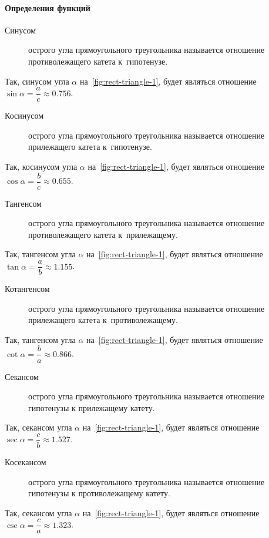 \documentclass[]{scrartcl}
\begin{document}
\paragraph{Определения функций}
\begin{description}
	\item[Синусом] острого угла прямоугольного треугольника называется отношение противолежащего катета к~гипотенузе.
\end{description}
Так, синусом угла ${\textstyle \alpha}$ на~\ref{fig:rect-triangle-1}, будет являться отношение ${\textstyle \sin \alpha = \dfrac{a}{c} \approx 0.756}$.
\begin{description}
	\item[Косинусом] острого угла прямоугольного треугольника называется отношение прилежащего катета к~гипотенузе.
\end{description}
Так, косинусом угла ${\textstyle \alpha}$ на~\ref{fig:rect-triangle-1}, будет являться отношение ${\textstyle \cos \alpha = \dfrac{b}{c} \approx 0.655}$.
\begin{description}
	\item[Тангенсом] острого угла прямоугольного треугольника называется отношение противолежащего катета к~прилежащему.
\end{description}
Так, тангенсом угла ${\textstyle \alpha}$ на~\ref{fig:rect-triangle-1}, будет являться отношение ${\textstyle \tan \alpha = \dfrac{a}{b} \approx 1.155}$.
\begin{description}
	\item[Котангенсом] острого угла прямоугольного треугольника называется отношение прилежащего катета к~противолежащему.
\end{description}
Так, тангенсом угла ${\textstyle \alpha}$ на~\ref{fig:rect-triangle-1}, будет являться отношение ${\textstyle \cot \alpha = \dfrac{b}{a} \approx 0.866}$.
\begin{description}
	\item[Секансом] острого угла прямоугольного треугольника называется отношение гипотенузы к прилежащему катету.
\end{description}
Так, секансом угла ${\textstyle \alpha}$ на~\ref{fig:rect-triangle-1}, будет являться отношение ${\textstyle \sec \alpha = \dfrac{c}{b} \approx 1.527}$.
\begin{description}
	\item[Косекансом] острого угла прямоугольного треугольника называется отношение гипотенузы к противолежащему катету.
\end{description}
Так, секансом угла ${\textstyle \alpha}$ на~\ref{fig:rect-triangle-1}, будет являться отношение ${\textstyle \csc \alpha = \dfrac{c}{a} \approx 1.323}$.
\end{document}
